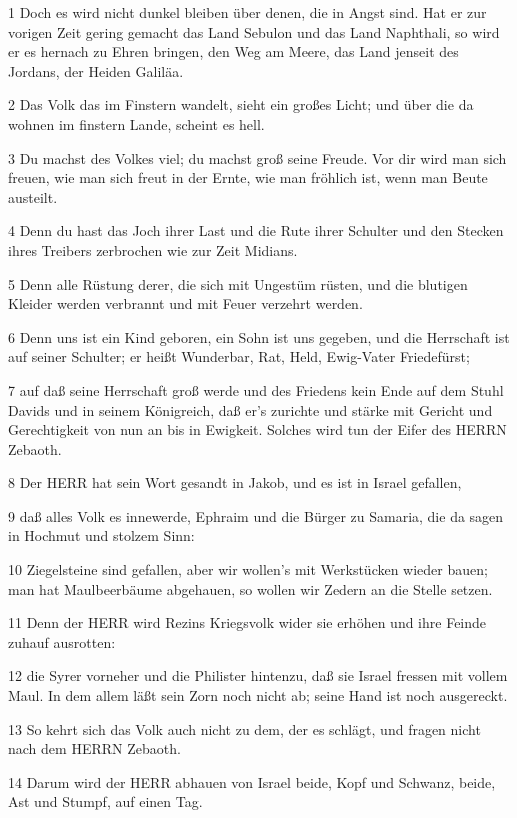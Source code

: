 \par 1 Doch es wird nicht dunkel bleiben über denen, die in Angst sind. Hat er zur vorigen Zeit gering gemacht das Land Sebulon und das Land Naphthali, so wird er es hernach zu Ehren bringen, den Weg am Meere, das Land jenseit des Jordans, der Heiden Galiläa.
\par 2 Das Volk das im Finstern wandelt, sieht ein großes Licht; und über die da wohnen im finstern Lande, scheint es hell.
\par 3 Du machst des Volkes viel; du machst groß seine Freude. Vor dir wird man sich freuen, wie man sich freut in der Ernte, wie man fröhlich ist, wenn man Beute austeilt.
\par 4 Denn du hast das Joch ihrer Last und die Rute ihrer Schulter und den Stecken ihres Treibers zerbrochen wie zur Zeit Midians.
\par 5 Denn alle Rüstung derer, die sich mit Ungestüm rüsten, und die blutigen Kleider werden verbrannt und mit Feuer verzehrt werden.
\par 6 Denn uns ist ein Kind geboren, ein Sohn ist uns gegeben, und die Herrschaft ist auf seiner Schulter; er heißt Wunderbar, Rat, Held, Ewig-Vater Friedefürst;
\par 7 auf daß seine Herrschaft groß werde und des Friedens kein Ende auf dem Stuhl Davids und in seinem Königreich, daß er's zurichte und stärke mit Gericht und Gerechtigkeit von nun an bis in Ewigkeit. Solches wird tun der Eifer des HERRN Zebaoth.
\par 8 Der HERR hat sein Wort gesandt in Jakob, und es ist in Israel gefallen,
\par 9 daß alles Volk es innewerde, Ephraim und die Bürger zu Samaria, die da sagen in Hochmut und stolzem Sinn:
\par 10 Ziegelsteine sind gefallen, aber wir wollen's mit Werkstücken wieder bauen; man hat Maulbeerbäume abgehauen, so wollen wir Zedern an die Stelle setzen.
\par 11 Denn der HERR wird Rezins Kriegsvolk wider sie erhöhen und ihre Feinde zuhauf ausrotten:
\par 12 die Syrer vorneher und die Philister hintenzu, daß sie Israel fressen mit vollem Maul. In dem allem läßt sein Zorn noch nicht ab; seine Hand ist noch ausgereckt.
\par 13 So kehrt sich das Volk auch nicht zu dem, der es schlägt, und fragen nicht nach dem HERRN Zebaoth.
\par 14 Darum wird der HERR abhauen von Israel beide, Kopf und Schwanz, beide, Ast und Stumpf, auf einen Tag.
